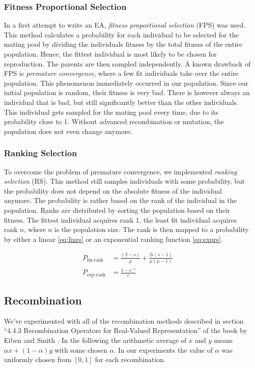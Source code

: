 \subsubsection{Fitness Proportional Selection}
In a first attempt to write an EA, \emph{fitness proportional selection} (FPS) was used. This
method calculates a probability for each individual to be selected for the mating pool by dividing
the individuals fitness by the total fitness of the entire population. Hence, the fittest
individual is most likely to be chosen for reproduction. The parents are then sampled
independently. A known drawback of FPS is \emph{premature convergence}, where a few fit individuals
take over the entire population. This phenomenon immediately occurred in our population. Since our
initial population is random, their fitness is very bad. There is however always an individual that
is bad, but still significantly better than the other individuals. This
individual gets sampled for the mating pool every time, due to its probability close to 1. Without
advanced recombination or mutation, the population does not even change anymore.

\subsubsection{Ranking Selection}
To overcome the problem of premature convergence, we implemented \emph{ranking selection} (RS).
This method still samples individuals with some probability, but the probability does not depend on
the absolute fitness of the individual anymore. The probability is rather based on the rank of the
individual in the population. Ranks are distributed by sorting the population based on their
fitness. The fittest individual acquires rank 1, the least fit individual acquires rank $n$, where
$n$ is the population size. The rank is then mapped to a probability by either a linear
\eqref{eq:linrs} or an exponential ranking function \ref{eq:exprs}.

\begin{align}
\label{eq:linrs}P_{\text{lin-rank}} &= \frac{(2-s)}{\mu} + \frac{2i(s-1)}{\mu(\mu-1)}\\
\label{eq:exprs}P_{\text{exp-rank}} &= \frac{1-e^{-i}}{c}
\end{align}


\subsection{Recombination} \label{sec:recombination}
We've experimented with all of the recombination methods described in section ``4.4.3 Recombination
Operators for Real-Valued Representation'' of the book by Eiben and Smith
\cite{eiben2003introduction}. In the following the arithmetic average of $x$ and $y$ means $\alpha x
+ (1 - \alpha) y$ with some chosen $\alpha$. In our experiments the value of $\alpha$ was uniformly
chosen from $[0, 1]$ for each recombination.

